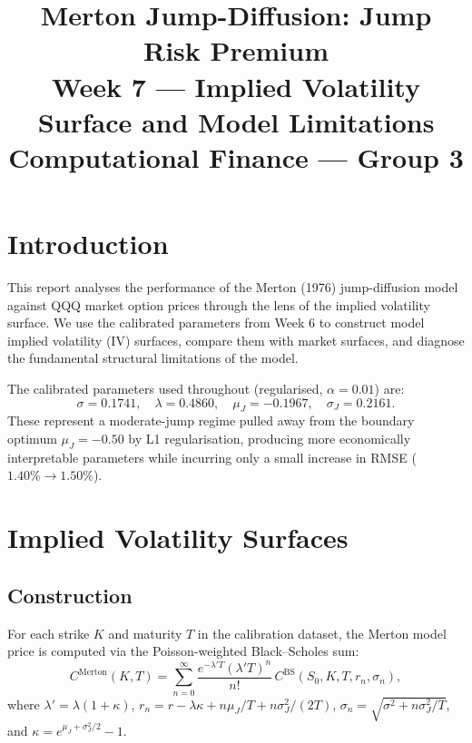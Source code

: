 \documentclass[12pt, a4paper]{article}
\title{
    \Large\textbf{Merton Jump-Diffusion: Jump Risk Premium}\\[6pt]
    \large Week 7 --- Implied Volatility Surface and Model Limitations\\[4pt]
    \normalsize Computational Finance --- Group 3
}
\author{}
\date{}
\begin{document}
\maketitle
\thispagestyle{empty}
\newpage

\section{Introduction}

This report analyses the performance of the Merton (1976) jump-diffusion model
against QQQ market option prices through the lens of the implied volatility
surface. We use the calibrated parameters from Week 6 to construct model
implied volatility (IV) surfaces, compare them with market surfaces, and
diagnose the fundamental structural limitations of the model.

The calibrated parameters used throughout (regularised, $\alpha=0.01$) are:
\[
    \sigma = 0.1741,\quad
    \lambda = 0.4860,\quad
    \mu_J = -0.1967,\quad
    \sigma_J = 0.2161.
\]
These represent a moderate-jump regime pulled away from the boundary optimum
$\mu_J = -0.50$ by L1 regularisation, producing more economically interpretable
parameters while incurring only a small increase in RMSE ($1.40\% \to 1.50\%$).

\section{Implied Volatility Surfaces}

\subsection{Construction}

For each strike $K$ and maturity $T$ in the calibration dataset, the Merton
model price is computed via the Poisson-weighted Black--Scholes sum:
\begin{equation}
    C^{\text{Merton}}(K,T) = \sum_{n=0}^{\infty}
    \frac{e^{-\lambda' T}(\lambda' T)^n}{n!}\,
    C^{\text{BS}}\!\left(S_0, K, T, r_n, \sigma_n\right),
    \label{eq:merton_sum}
\end{equation}
where $\lambda' = \lambda(1+\kappa)$,
$r_n = r - \lambda\kappa + n\mu_J/T + n\sigma_J^2/(2T)$,
$\sigma_n = \sqrt{\sigma^2 + n\sigma_J^2/T}$, and
$\kappa = e^{\mu_J + \sigma_J^2/2}-1$.
\end{document}
